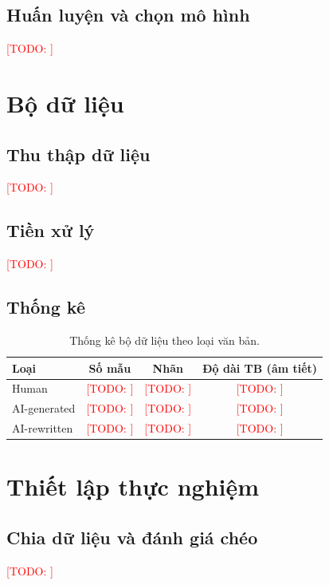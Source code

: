 \documentclass[11pt,a4paper]{article}
\newcommand{\todo}[1]{\textcolor{red}{[TODO: #1]}}
\begin{document}
\subsection{Huấn luyện và chọn mô hình}
\todo{}

\section{Bộ dữ liệu}
\label{sec:dataset}

\subsection{Thu thập dữ liệu}
\todo{}

\subsection{Tiền xử lý}
\todo{}

\subsection{Thống kê}
\begin{table}[t]
  \centering
  \caption{Thống kê bộ dữ liệu theo loại văn bản.}
  \label{tab:dataset}
  \begin{tabular}{lccc}
    \toprule
    Loại & Số mẫu & Nhãn & Độ dài TB (âm tiết) \\
    \midrule
    Human         & \todo{} & \todo{} & \todo{} \\
    AI-generated  & \todo{} & \todo{} & \todo{} \\
    AI-rewritten  & \todo{} & \todo{} & \todo{} \\
    \bottomrule
  \end{tabular}
\end{table}

\section{Thiết lập thực nghiệm}
\label{sec:setup}

\subsection{Chia dữ liệu và đánh giá chéo}
\todo{}
\end{document}
